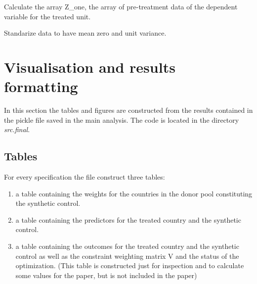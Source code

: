 \documentclass[a4paper,11pt,english]{sphinxmanual}
\begin{document}

\begin{fulllineitems}
\label{analysis:src.analysis.synthetic_control.get_z_zero_from_data}
Calculate the array Z\_one, the array of pre-treatment data of the
dependent variable for the treated unit.

\end{fulllineitems}


\begin{fulllineitems}
\label{analysis:src.analysis.synthetic_control.standarize_data}
Standarize data to have mean zero and unit variance.

\end{fulllineitems}



\chapter{Visualisation and results formatting}
\label{final:visualisation-and-results-formatting}\label{final:final}\label{final::doc}
In this section the tables and figures are constructed from the results contained in the pickle file saved in the main analysis.
The code is located in the directory \emph{src.final}.


\section{Tables}
\label{final:tables}
For every specification the file  construct three tables:
\begin{enumerate}
\item {} 
a table containing the weights for the countries in the donor pool constituting the synthetic control.

\item {} 
a table containing the predictors for the treated country and the synthetic control.

\item {} 
a table containing the outcomes for the treated country and the synthetic control as well as the constraint weighting matrix V and the status of the optimization. (This table is constructed just for inspection and to calculate some values for the paper, but is not included in the paper)

\end{enumerate}
\end{document}
